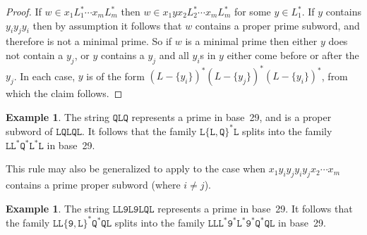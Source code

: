 \documentclass[12pt]{article}
\theoremstyle{plain}
\theoremstyle{definition}
\newtheorem{example}[theorem]{Example}
\theoremstyle{remark}
\newcommand{\0}{\mathtt{0}}
\newcommand{\1}{\mathtt{1}}
\newcommand{\2}{\mathtt{2}}
\newcommand{\3}{\mathtt{3}}
\newcommand{\4}{\mathtt{4}}
\newcommand{\5}{\mathtt{5}}
\newcommand{\6}{\mathtt{6}}
\newcommand{\7}{\mathtt{7}}
\newcommand{\8}{\mathtt{8}}
\newcommand{\9}{\mathtt{9}}
\begin{document}
\begin{proof}
If $w\in x_1L_1^*\dotsm x_mL_m^*$ then $w\in x_1yx_2L_2^*\dotsm x_mL_m^*$ for some $y\in L_1^*$.
If $y$ contains $y_iy_jy_i$ then by assumption it follows that $w$ contains a proper prime subword,
and therefore is not a minimal prime.  So if $w$ is a minimal prime then either $y$ does not contain
a $y_j$, or $y$ contains a $y_j$ and all $y_i$s in $y$ either come before or after the $y_j$.
In each case, $y$ is of the form $(L-\{y_i\})^*(L-\{y_j\})^*(L-\{y_i\})^*$, from which the claim follows.
\end{proof}
\begin{example}
The string $\mathtt{QLQ}$ represents a prime in base~29, and is a proper subword of $\mathtt{LQLQL}$.
It follows that the family $\mathtt{L}\{\mathtt{L},\mathtt{Q}\}^*\mathtt{L}$ splits into the family $\mathtt{L}\mathtt{L}^*\mathtt{Q}^*\mathtt{L}^*\mathtt{L}$ in base~29.
\end{example}
This rule may also be generalized to apply to the case when $x_1y_iy_jy_iy_jx_2\dotsm x_m$ contains a prime proper subword (where $i\neq j$).
\begin{example}
The string $\mathtt{LL9L9LQL}$ represents a prime in base~29.  It follows that the family $\mathtt{LL\{\mathtt{9},\mathtt{L}\}^*\mathtt{Q}^*\mathtt{QL}}$ splits into the family $\mathtt{LL\mathtt{L}^*\mathtt{9}^*\mathtt{L}^*\mathtt{9}^*\mathtt{Q}^*\mathtt{QL}}$ in base~29.
\end{example}
\end{document}
